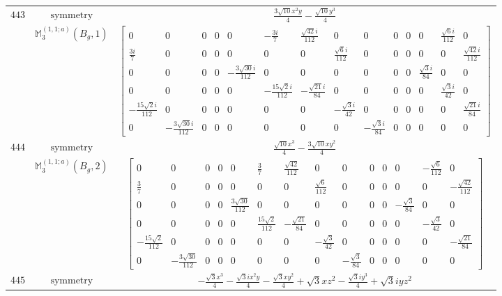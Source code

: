 \documentclass[fleqn,8pt,landscape]{jsarticle}
\begin{document}
\begin{longtable}{ccc}
$ 443 $ & $ \text{symmetry} $ & $ \frac{3 \sqrt{10} x^{2} y}{4} - \frac{\sqrt{10} y^{3}}{4} $ \\
$  $ & $ \mathbb{M}_{3}^{(1,1;a)}(B_{g},1) $ & $ \begin{bmatrix} 0 & 0 & 0 & 0 & 0 & - \frac{3 i}{7} & \frac{\sqrt{42} i}{112} & 0 & 0 & 0 & 0 & 0 & \frac{\sqrt{6} i}{112} & 0 \\ \frac{3 i}{7} & 0 & 0 & 0 & 0 & 0 & 0 & \frac{\sqrt{6} i}{112} & 0 & 0 & 0 & 0 & 0 & \frac{\sqrt{42} i}{112} \\ 0 & 0 & 0 & 0 & - \frac{3 \sqrt{30} i}{112} & 0 & 0 & 0 & 0 & 0 & 0 & \frac{\sqrt{3} i}{84} & 0 & 0 \\ 0 & 0 & 0 & 0 & 0 & - \frac{15 \sqrt{2} i}{112} & - \frac{\sqrt{21} i}{84} & 0 & 0 & 0 & 0 & 0 & \frac{\sqrt{3} i}{42} & 0 \\ - \frac{15 \sqrt{2} i}{112} & 0 & 0 & 0 & 0 & 0 & 0 & - \frac{\sqrt{3} i}{42} & 0 & 0 & 0 & 0 & 0 & \frac{\sqrt{21} i}{84} \\ 0 & - \frac{3 \sqrt{30} i}{112} & 0 & 0 & 0 & 0 & 0 & 0 & - \frac{\sqrt{3} i}{84} & 0 & 0 & 0 & 0 & 0 \end{bmatrix} $ \\ \hline
$ 444 $ & $ \text{symmetry} $ & $ \frac{\sqrt{10} x^{3}}{4} - \frac{3 \sqrt{10} x y^{2}}{4} $ \\
$  $ & $ \mathbb{M}_{3}^{(1,1;a)}(B_{g},2) $ & $ \begin{bmatrix} 0 & 0 & 0 & 0 & 0 & \frac{3}{7} & \frac{\sqrt{42}}{112} & 0 & 0 & 0 & 0 & 0 & - \frac{\sqrt{6}}{112} & 0 \\ \frac{3}{7} & 0 & 0 & 0 & 0 & 0 & 0 & \frac{\sqrt{6}}{112} & 0 & 0 & 0 & 0 & 0 & - \frac{\sqrt{42}}{112} \\ 0 & 0 & 0 & 0 & \frac{3 \sqrt{30}}{112} & 0 & 0 & 0 & 0 & 0 & 0 & - \frac{\sqrt{3}}{84} & 0 & 0 \\ 0 & 0 & 0 & 0 & 0 & \frac{15 \sqrt{2}}{112} & - \frac{\sqrt{21}}{84} & 0 & 0 & 0 & 0 & 0 & - \frac{\sqrt{3}}{42} & 0 \\ - \frac{15 \sqrt{2}}{112} & 0 & 0 & 0 & 0 & 0 & 0 & - \frac{\sqrt{3}}{42} & 0 & 0 & 0 & 0 & 0 & - \frac{\sqrt{21}}{84} \\ 0 & - \frac{3 \sqrt{30}}{112} & 0 & 0 & 0 & 0 & 0 & 0 & - \frac{\sqrt{3}}{84} & 0 & 0 & 0 & 0 & 0 \end{bmatrix} $ \\ \hline
$ 445 $ & $ \text{symmetry} $ & $ - \frac{\sqrt{3} x^{3}}{4} - \frac{\sqrt{3} i x^{2} y}{4} - \frac{\sqrt{3} x y^{2}}{4} + \sqrt{3} x z^{2} - \frac{\sqrt{3} i y^{3}}{4} + \sqrt{3} i y z^{2} $ \\

\end{longtable}
\end{document}
